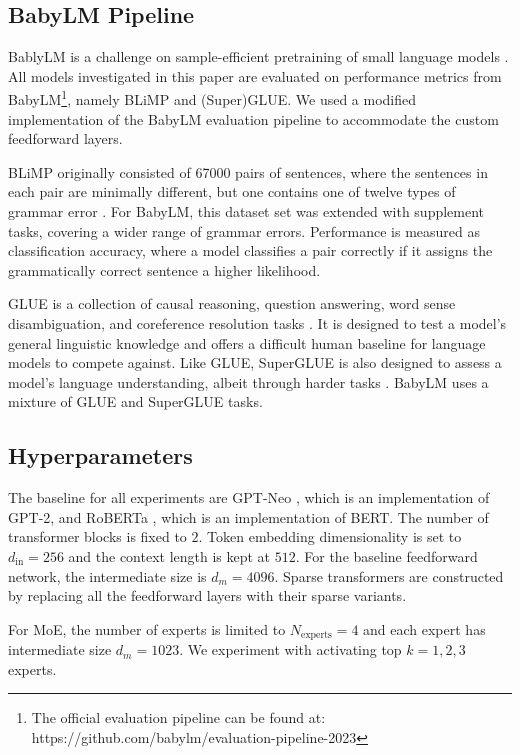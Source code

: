 \subsection{BabyLM Pipeline}
BablyLM is a challenge on sample-efficient pretraining of small language models \cite{warstadt_call_2023}. All models investigated in this paper are evaluated on performance metrics from BabyLM\footnote{The official evaluation pipeline can be found at: https://github.com/babylm/evaluation-pipeline-2023}, namely BLiMP and (Super)GLUE. We used a modified implementation of the BabyLM evaluation pipeline to accommodate the custom feedforward layers.

BLiMP originally consisted of 67000 pairs of sentences, where the sentences in each pair are minimally different, but one contains one of twelve types of grammar error \cite{warstadt_blimp_2023}. For BabyLM, this dataset set was extended with supplement tasks, covering a wider range of grammar errors. Performance is measured as classification accuracy, where a model classifies a pair correctly if it assigns the grammatically correct sentence a higher likelihood.

GLUE is a collection of causal reasoning, question answering, word sense disambiguation, and coreference resolution tasks \cite{wang_glue_2019}. It is designed to test a model's general linguistic knowledge and offers a difficult human baseline for language models to compete against. Like GLUE, SuperGLUE is also designed to assess a model's language understanding, albeit through harder tasks \cite{wang_superglue_2020}. BabyLM uses a mixture of GLUE and SuperGLUE tasks.


\subsection{Hyperparameters}
The baseline for all experiments are GPT-Neo \cite{black_gpt-neo_2021}, which is an implementation of GPT-2, and RoBERTa \cite{liu_roberta_2019}, which is an implementation of BERT. The number of transformer blocks is fixed to $2$. Token embedding dimensionality is set to $d_\text{in}=256$ and the context length is kept at $512$. For the baseline feedforward network, the intermediate size is $d_m = 4096$. Sparse transformers are constructed by replacing all the feedforward layers with their sparse variants.

For MoE, the number of experts is limited to $N_\text{experts}=4$ and each expert has intermediate size $d_m = 1023$. We experiment with activating top $k=1,2,3$ experts.

